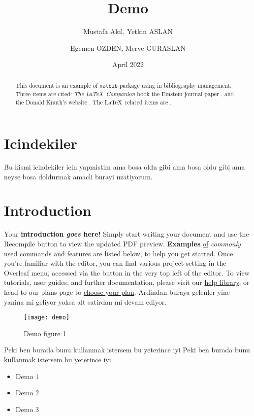 \documentclass[12pt]{article}
\title{Demo}
\author{Mustafa Akil, Yetkin ASLAN}
\author{Egemen OZDEN, Merve GURASLAN}
\date{April 2022}
\begin{document}
\maketitle


\tableofcontents \newpage

\begin{abstract}
This document is an example of \texttt{natbib} package using in bibliography
management. Three items are cited: \textit{The \LaTeX\ Companion} book 
 the Einstein journal paper \cite{einstein}, and the 
Donald Knuth's website \cite{knuthwebsite}. The \LaTeX\ related items are 
\cite{latexcompanion,knuthwebsite}.
\end{abstract}


\section{Icindekiler}
Bu kismi icindekiler icin yapmistim ama bosa oldu gibi ama bosa oldu gibi ama neyse bosa doldurmak amacli burayi uzatiyorum.

\section{Introduction}
Your \textbf{introduction \emph{goes} here!} Simply start writing your document and use the Recompile button to view the updated PDF preview. \textbf{Examples} \underline{of} \textit{commonly} used commands and features are listed below, to help you get started.  Once you're familiar with the editor, you can find various project setting in the Overleaf menu, accessed via the button in the very top left of the editor. To view tutorials, user guides, and further documentation, please visit our \href{https://www.overleaf.com/learn}{help library}, or head to our plans page to \href{https://www.overleaf.com/user/subscription/plans}{choose your plan}. Ardindan buraya gelenler yine yanina mi geliyor yoksa alt satirdan mi devam ediyor.

\begin{figure}[h]
    \centering
    \texttt{[image: demo]}
    \caption{Demo figure 1}
    \label{fig:demo1}
\end{figure}

Peki ben burada \pageref{fig:demo1} bunu kullanmak istersem bu yeterince iyi
Peki ben burada \pageref{fig:demo1} bunu kullanmak istersem bu yeterince iyi

\begin{itemize}
    \item Demo 1
    \item Demo 2
    \item Demo 3
\end{itemize}
\end{document}
